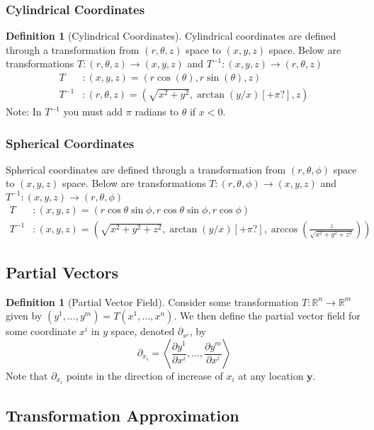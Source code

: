 \documentclass[11pt]{article}
\theoremstyle{definition}
\newtheorem{definition}[theorem]{Definition}
\newcommand{\pder}[2]{\frac{\partial{#1}}{\partial{#2}}}
\begin{document}
\subsubsection{Cylindrical Coordinates}
\begin{definition}[Cylindrical Coordinates]
Cylindrical coordinates are defined through a transformation from $(r,
\theta, z)$ space to $(x,y,z)$ space. 
Below are transformations $T: (r, \theta,z) \to (x,y,z)$ and $T^{-1}:
(x,y,z) \to (r,\theta,z)$
\begin{align*}
    T&: (x,y,z) = (r\cos(\theta),r\sin(\theta),z) \\
    T^{-1}&: (r,\theta,z) = (\sqrt{x^2+y^2},\arctan(y/x)[+\pi?],z)
\end{align*}
Note: In $T^{-1}$ you must add $\pi$ radians to $\theta$ if $x<0$. 
\end{definition}
\subsubsection{Spherical Coordinates}
Spherical coordinates are defined through a transformation from
$(r,\theta,\phi)$ space to $(x,y,z)$ space.
Below are transformations $T: (r, \theta, \phi) \to (x,y,z)$ and $T^{-1}:
(x,y,z) \to (r,\theta, \phi)$
\begin{align*}
    T&: (x,y,z) =
    (r\cos\theta\sin\phi,r\cos\theta\sin\phi,r\cos\phi)\\
    T^{-1}&: (x,y,z) =
    (\sqrt{x^2+y^2+z^2},\arctan(y/x)[+\pi?],\arccos(\frac{z}{\sqrt{x^2+y^2+z^2}}))
\end{align*}
\subsection{Partial Vectors}
\begin{definition}[Partial Vector Field]
Consider some transformation $T: \mathbb{R}^n \to \mathbb{R}^m$ given by
$(y^1,\dots,y^m) = T(x^1, \dots, x^n)$. We then define the partial vector
field for some coordinate $x^i$ in $y$ space, denoted $\partial_{x^i}$, by
$$ \partial_{x_i} = \left\langle \pder{y^1}{x^i}, \dots, \pder{y^m}{x^i} \right\rangle$$
Note that $\partial_{x_i}$ points in the direction of increase of $x_i$ at
any location $\mathbf{y}$.
\end{definition}
\subsection{Transformation Approximation}
\end{document}
